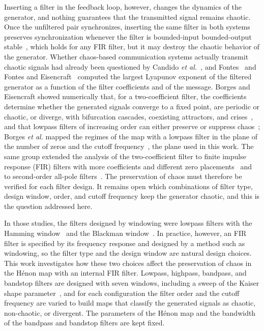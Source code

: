 \documentclass[journal]{IEEEtran}
\begin{document}
Inserting a filter in the feedback loop, however, changes the dynamics of the
generator, and nothing guarantees that the transmitted signal remains
chaotic. Once the unfiltered pair synchronizes, inserting the same filter in both systems
preserves synchronization whenever the filter is bounded-input bounded-output
stable~\cite{BorgesTese2026}, which holds for any FIR filter, but it may destroy
the chaotic behavior of the generator. Whether chaos-based communication systems
actually transmit chaotic signals had already been questioned by Candido
\textit{et al.}~\cite{Candido2015}, and Fontes~\cite{Fontes2017} and Fontes and
Eisencraft~\cite{FontesSAI} computed the largest Lyapunov exponent of the
filtered generator as a function of the filter coefficients and of the message. Borges and Eisencraft showed numerically that, for a two-coefficient filter, the
coefficients determine whether the generated signals converge to a fixed point,
are periodic or chaotic, or diverge, with bifurcation cascades, coexisting
attractors, and crises~\cite{BorgesCSF2022}, and that lowpass filters of
increasing order can either preserve or suppress chaos~\cite{Borges2022sbrt};
Borges \textit{et al.} mapped the regimes of the map with a lowpass filter in
the plane of the number of zeros and the cutoff frequency~\cite{CNMAC2023}, the
plane used in this work.
The same group extended the analysis of the two-coefficient filter to finite
impulse response (FIR) filters with more coefficients and different zero
placements~\cite{BorgesCNSNS2024} and to second-order all-pole
filters~\cite{Borges2024sbrt}. The preservation of
chaos must therefore be verified for each filter design. It remains open
which combinations of filter type, design window, order, and cutoff
frequency keep the generator chaotic, and this is the question addressed
here.

In those studies, the filters designed by windowing were lowpass filters with
the Hamming window~\cite{BorgesCNSNS2024,Borges2022sbrt,CNMAC2023} and the
Blackman window~\cite{Borges2022sbrt}.
In practice, however, an FIR filter is specified by its frequency response
and designed by a method such as windowing, so the filter type and the design
window are natural design choices. This work investigates how these two
choices affect the preservation of chaos in the H\'enon map with an internal
FIR filter. Lowpass, highpass, bandpass, and bandstop filters are designed
with seven windows, including a sweep of the Kaiser shape
parameter~\cite{Kaiser1980}, and for each configuration the filter order and
the cutoff frequency are varied to build maps that classify the generated
signals as chaotic, non-chaotic, or divergent. The parameters of the H\'enon map
and the bandwidth of the bandpass and bandstop filters are kept fixed.
\end{document}
